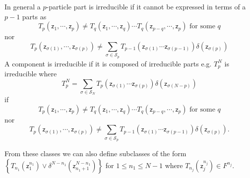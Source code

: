 \documentclass[aps,preprint]{revtex4}%
\begin{document}
In general a $p$-particle part is irreducible if it cannot be expressed in
terms of a $p-1$ parts as
\begin{equation}
T_{p}\left(  \mathsf{z}_{1},\cdots,\mathsf{z}_{p}\right)  \neq T_{q}\left(
\mathsf{z}_{1},\cdots,\mathsf{z}_{q}\right)  \cdots T_{q}\left(
\mathsf{z}_{p-q},\cdots,\mathsf{z}_{p}\right)  \text{ for some }q
\end{equation}
nor
\begin{equation}
T_{p}\left(  \mathsf{z}_{\sigma\left(  1\right)  },\cdots,\mathsf{z}%
_{\sigma\left(  p\right)  }\right)  \neq%
{\displaystyle\sum\limits_{\sigma\in\mathcal{S}_{p}}}
T_{p-1}\left(  \mathsf{z}_{\sigma\left(  1\right)  }\cdots\mathsf{z}%
_{\sigma\left(  p-1\right)  }\right)  \delta\left(  \mathsf{z}_{\sigma\left(
p\right)  }\right)
\end{equation}
A component is irreducible if it is composed of irreducible parts e.g.
$T_{p}^{N}$ is irreducible where
\begin{equation}
T_{p}^{N}=%
{\displaystyle\sum\limits_{\sigma\in\mathcal{S}_{N}}}
T_{p}\left(  \mathsf{z}_{\sigma\left(  1\right)  }\cdots\mathsf{z}%
_{\sigma\left(  p\right)  }\right)  \delta\left(  \mathsf{z}_{\sigma\left(
N-p\right)  }\right)
\end{equation}
if
\begin{equation}
T_{p}\left(  \mathsf{z}_{1},\cdots,\mathsf{z}_{p}\right)  \neq T_{q}\left(
\mathsf{z}_{1},\cdots,\mathsf{z}_{q}\right)  \cdots T_{q}\left(
\mathsf{z}_{p-q},\cdots,\mathsf{z}_{p}\right)  \text{ for some }q
\end{equation}
nor%
\begin{equation}
T_{p}\left(  \mathsf{z}_{\sigma\left(  1\right)  },\cdots,\mathsf{z}%
_{\sigma\left(  p\right)  }\right)  \neq%
{\displaystyle\sum\limits_{\sigma\in\mathcal{S}_{p}}}
T_{p-1}\left(  \mathsf{z}_{\sigma\left(  1\right)  }\cdots\mathsf{z}%
_{\sigma\left(  p-1\right)  }\right)  \delta\left(  \mathsf{z}_{\sigma\left(
p\right)  }\right)  .
\end{equation}


From these classes we can also define subclasses of the form $\left\{
T_{n_{1}}\left(  \mathsf{z}_{1}^{n_{1}}\right)  \vee\delta^{N-n_{1}}\left(
\mathsf{z}_{n_{1}+1}^{N-n_{1}}\right)  \right\}  $ for $1\leq n_{1}\leq N-1$
where $T_{n_{j}}\left(  \mathsf{z}_{j}^{n_{j}}\right)  \in F^{n_{j}}$.
\end{document}
